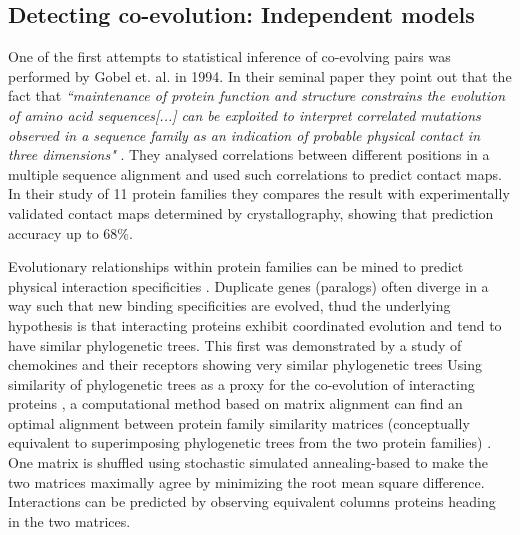 
\subsection{Detecting co-evolution: Independent models}

One of the first attempts to statistical inference of co-evolving pairs was performed by Gobel et. al. in 1994.
In their seminal paper they point out that the fact that \textit{``maintenance of protein function and structure constrains the evolution of amino acid sequences[...] can be exploited to interpret correlated mutations observed in a sequence family as an indication of probable physical contact in three dimensions"} \cite{gobel1994correlated}. 
They  analysed correlations between different positions in a multiple sequence alignment and used such correlations to predict contact maps.
In their study of 11 protein families they compares the result with experimentally validated contact maps determined by crystallography, showing that prediction accuracy up to $68\%$.

Evolutionary relationships within protein families can be mined to predict physical interaction specificities \cite{ramani2003exploiting}.
Duplicate genes (paralogs) often diverge in a way such that new binding specificities are evolved, thud the underlying hypothesis is that interacting proteins exhibit coordinated evolution and tend to have similar phylogenetic trees.
This first was demonstrated by a study of chemokines and their receptors showing very similar phylogenetic trees \cite{ramani2003exploiting:REF}
Using similarity of phylogenetic trees as a proxy for the co-evolution of interacting proteins \cite{ramani2003exploiting}, a computational method based on matrix alignment can find an optimal alignment between protein family similarity matrices (conceptually equivalent to superimposing  phylogenetic trees from the two protein families) \cite{ramani2003exploiting}.
One matrix is shuffled using stochastic simulated annealing-based to make the two matrices maximally agree by minimizing the root mean square difference.
Interactions can be predicted by observing equivalent columns proteins heading in the two matrices.  \cite{ramani2003exploiting}

